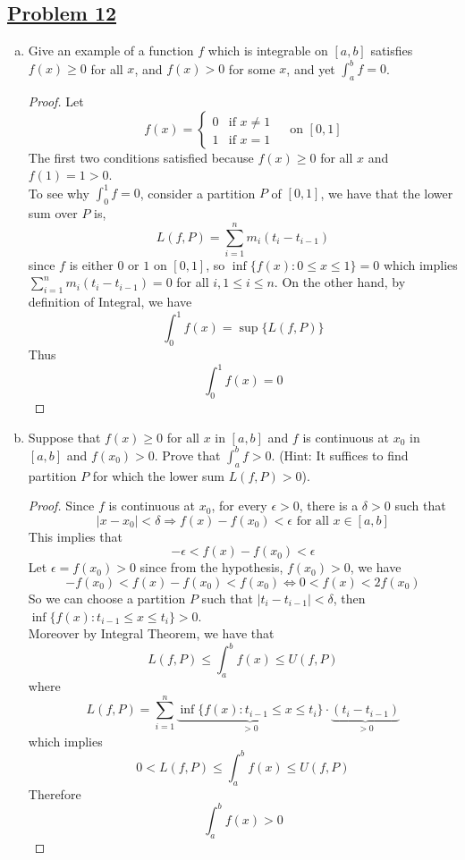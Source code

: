 \documentclass[10pt,letterpaper]{article}
\begin{document}
	\subsection*{{\color{purple}\underline{Problem 12}}}
	\text{ }
	\begin{enumerate}[(a)]
		\item Give an example of a function $f$ which is integrable on $[a, b]$ satisfies
		$f(x) \geq 0$ for all $x$, and $f(x) > 0$ for some $x$, and yet 
		$\displaystyle\int_{a}^{b} f = 0$.
		\begin{proof}
		Let 
		$$
		f(x) = 		
		\begin{cases}
		0  & \text{if } x \neq 1 \\
		1  & \text{if } x = 1
		\end{cases}
		\,\,\,\,\, \text{ on } [0, 1]
		$$
		The first two conditions satisfied because $f(x) \geq 0$ for all $x$ and $f(1) = 1 > 0$. \\
		To see why 
		$\displaystyle\int_{0}^{1}f = 0$, consider a partition $P$ of $[0, 1]$, we have
		that the lower sum over $P$ is,
		$$L(f, P) = \displaystyle\sum_{i=1}^{n} m_i(t_i - t_{i-1})$$
		since $f$ is either $0$ or $1$ on $[0, 1]$, so $\inf\{f(x): 0 \leq x \leq 1\} = 0$ which 
		implies  $\displaystyle\sum_{i=1}^{n} m_i(t_i - t_{i-1}) = 0$ for all $i, 1 \leq i \leq n$.
		On the other hand, by definition of Integral, we have
		$$\displaystyle\int_{0}^{1} f(x) = \sup\{L(f, P)\}$$	
		Thus
		$$\displaystyle\int_{0}^{1} f(x) = 0$$			
		\end{proof}
		
		\item Suppose that $f(x) \geq 0$ for all $x$ in $[a, b]$ and $f$ is continuous
		at $x_0$ in $[a, b]$ and $f(x_0) > 0$. Prove that 
		$\displaystyle\int_{a}^{b} f > 0$. (Hint: It suffices to find  partition
		$P$ for which the lower sum $L(f, P) > 0$).		
		\begin{proof}
		Since $f$ is continuous at $x_0$, for every $\epsilon > 0$, there is a
		$\delta > 0$ such that
		$$|x - x_0| < \delta \Rightarrow f(x) - f(x_0) < \epsilon \text{ for all } x \in [a, b]$$
		This implies that
		$$-\epsilon < f(x) - f(x_0) < \epsilon$$
		Let $\epsilon = f(x_0) > 0$ since from the hypothesis, $f(x_0) > 0$, we have
		$$-f(x_0) < f(x) - f(x_0) < f(x_0) \Leftrightarrow 0 < f(x) < 2f(x_0)$$
		So we can choose a partition $P$ such that $|t_{i} - t_{i-1}| < \delta$, then 
		$\inf\{f(x): t_{i-1} \leq x \leq t_i\} > 0$. \\
		Moreover by Integral Theorem, we have that
		$$L(f, P) \leq \displaystyle\int_{a}^{b}f(x) \leq U(f, P)$$
		where
		$$L(f, P) = \displaystyle\sum_{i=1}^{n} 
		\underbrace{\inf\{f(x): t_{i-1} \leq x \leq t_i\}}_{>0} \cdot 
		\underbrace{(t_i - t_{i-1})}_{>0}$$
		which implies
		$$0 < L(f, P) \leq \displaystyle\int_{a}^{b}f(x) \leq U(f, P)$$
		Therefore
		$$\displaystyle\int_{a}^{b} f(x) > 0$$
		
		\end{proof}
	\end{enumerate}
\end{document}
